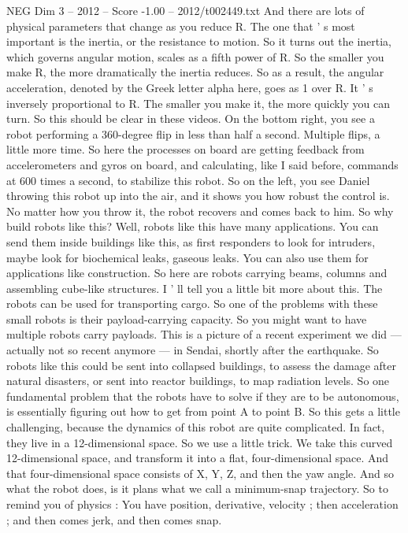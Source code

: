 \begin{textsample}{NEG Dim 3 – 2012 – Score -1.00 – 2012/t002449.txt}
And there are lots of physical parameters that change as you reduce R.
The one that ' s most important is the inertia, or the resistance to motion.
So it turns out the inertia, which governs angular motion, scales as a fifth power of R.
So the smaller you make R, the more dramatically the inertia reduces.
So as a result, the angular acceleration, denoted by the Greek letter alpha here, goes as 1 over R.
It ' s inversely proportional to R.
The smaller you make it, the more quickly you can turn.
So this should be clear in these videos.
On the bottom right, you see a robot performing a 360-degree flip in less than half a second.
Multiple flips, a little more time.
So here the processes on board are getting feedback from accelerometers and gyros on board, and calculating, like I said before, commands at 600 times a second, to stabilize this robot.
So on the left, you see Daniel throwing this robot up into the air, and it shows you how robust the control is.
No matter how you throw it, the robot recovers and comes back to him.
So why build robots like this?
Well, robots like this have many applications.
You can send them inside buildings like this, as first responders to look for intruders, maybe look for biochemical leaks, gaseous leaks.
You can also use them for applications like construction.
So here are robots carrying beams, columns and assembling cube-like structures.
I ' ll tell you a little bit more about this.
The robots can be used for transporting cargo.
So one of the problems with these small robots is their payload-carrying capacity.
So you might want to have multiple robots carry payloads.
This is a picture of a recent experiment we did — actually not so recent anymore — in Sendai, shortly after the earthquake.
So robots like this could be sent into collapsed buildings, to assess the damage after natural disasters, or sent into reactor buildings, to map radiation levels.
So one fundamental problem that the robots have to solve if they are to be autonomous, is essentially figuring out how to get from point A to point B.
So this gets a little challenging, because the dynamics of this robot are quite complicated.
In fact, they live in a 12-dimensional space.
So we use a little trick.
We take this curved 12-dimensional space, and transform it into a flat, four-dimensional space.
And that four-dimensional space consists of X, Y, Z, and then the yaw angle.
And so what the robot does, is it plans what we call a minimum-snap trajectory.
So to remind you of physics : You have position, derivative, velocity ; then acceleration ; and then comes jerk, and then comes snap.

\end{textsample}
